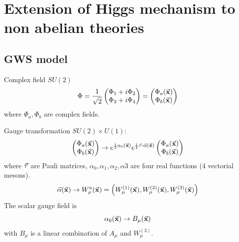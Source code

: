 \documentclass[../main/main.tex]{subfiles}
\begin{document}
\section{Extension of Higgs mechanism to non abelian theories}

\subsection{GWS model}
Complex field \( SU(2) \)
\begin{equation}
  \Phi = \frac{1}{\sqrt{2} } \begin{pmatrix}
  \Phi _1 + i \Phi _2 \\
  \Phi _3 + i \Phi _4
  \end{pmatrix}
  =
  \begin{pmatrix}
  \Phi _a (\va{x}) \\
  \Phi _b (\va{x})
  \end{pmatrix}
\end{equation}
where \( \Phi _a, \Phi _b \) are complex fields.

Gauge transformation \( SU(2) \times U(1) \):
\begin{equation}
  \begin{pmatrix}
  \Phi _a (\va{x}) \\
  \Phi _b (\va{x})
  \end{pmatrix}
  \rightarrow
  e^{\frac{i}{2} \alpha _0 (\va{x})} e^{\frac{i}{2} \va{\tau } \vdot \va{\alpha } (\va{x})}
  \begin{pmatrix}
  \Phi _a (\va{x}) \\
  \Phi _b (\va{x})
  \end{pmatrix}
\end{equation}
where \( \va{\tau } \) are Pauli matrices, \( \alpha _0, \alpha _1, \alpha _2, \alpha 3 \) are four real functions (4 vectorial mesons).
\begin{equation}
  \va{\alpha } (\va{x}) \rightarrow W _ \mu ^ a (\va{x}) = \qty( W_ \mu ^{(1)} (\va{x}),  W_ \mu ^{(2)} (\va{x}),  W_ \mu ^{(3)} (\va{x}) )
\end{equation}
The scalar gauge field is
\begin{equation}
  \alpha _0 (\va{x}) \rightarrow B _ \mu (\va{x})
\end{equation}
with \( B _ \mu  \) is a linear combination of \( A_ \mu  \) and \(  W_ \mu ^{(3)}  \).
\end{document}

